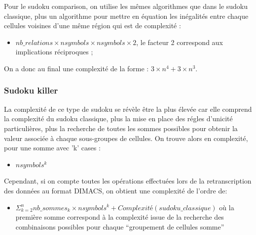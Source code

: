 \documentclass[a4paper,8pt,french,fleqn]{article}
\begin{document}
Pour le sudoku comparison, on utilise les mêmes algorithmes que dans le sudoku classique, plus un algorithme pour mettre en équation les inégalités entre chaque cellules voisines d'une même région qui est de complexité : \\

\begin{itemize}

\item $nb\_relations \times nsymbols \times nsymbols \times 2$, le facteur 2 correspond aux implications réciproques ;\\

\end{itemize}

On a donc au final une complexité de la forme : $3 \times n^{4} + 3 \times n^{3}$. 

\subsubsection*{Sudoku killer}

La complexité de ce type de sudoku se révèle être la plus élevée car elle comprend la complexité du sudoku classique, plus la mise en place des régles d'unicité particulières, plus la recherche de toutes les sommes possibles pour obtenir la valeur associée à chaque sous-groupes de cellules. On trouve alors en complexité, pour une somme avec 'k' cases : \\

\begin{itemize}

\item $nsymbols^{k}$ \\

\end{itemize}  

Cependant, si on compte toutes les opérations effectuées lors de la retranscription des données au format DIMACS, on obtient une complexité de l'ordre de:\\

\begin{itemize}

\item $\Sigma_{k=2}^{n} nb\_sommes_k \times nsymbols^{k} + Complexité(sudoku\_classique)$ où la première somme correspond à la complexité issue de la recherche des combinaisons possibles pour chaque ``groupement de cellules somme'' \\

\end{itemize}
\end{document}

